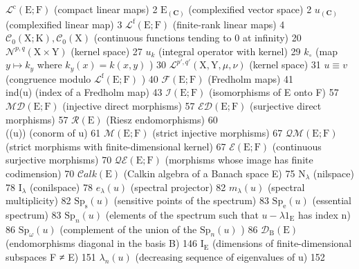 \(\mathcal{L}^{\mathrm{c}}(\mathrm{E};\mathrm{F})\) (compact linear maps) 2 \(\mathrm{E}_{(\mathbf{C})}\) (complexified vector space) 2 \(u_{(\mathbf{C})}\) (complexified linear map) 3 \(\mathcal{L}^{\mathrm{f}}(\mathrm{E};\mathrm{F})\) (finite-rank linear maps) 4 \(\mathcal{C}_0(\mathrm{X};\mathrm{K}), \mathcal{C}_0(\mathrm{X})\) (continuous functions tending to 0 at infinity) 20 \(\mathcal{N}^{p,q}(\mathrm{X} \times \mathrm{Y})\) (kernel space) 27 \(u_k\) (integral operator with kernel) 29 \(k_\circ\) (map \(y \mapsto k_y\) where \(k_y(x) = k(x,y)\) ) 30 \(\mathcal{L}^{p',q'}(\mathrm{X},\mathrm{Y},\mu,\nu)\) (kernel space) 31 \(u \equiv v\) (congruence modulo \(\mathcal{L}^{\mathrm{f}}(\mathrm{E};\mathrm{F})\) ) 40 \(\mathcal{F}(\mathrm{E};\mathrm{F})\) (Fredholm maps) 41\\
ind(u) (index of a Fredholm map) 43 \(\mathcal{I}(\mathrm{E};\mathrm{F})\) (isomorphisms of E onto F) 57 \(\mathcal{M}\mathcal{D}(\mathrm{E};\mathrm{F})\) (injective direct morphisms) 57 \(\mathcal{E}\mathcal{D}(\mathrm{E};\mathrm{F})\) (surjective direct morphisms) 57 \(\mathcal{R}(\mathrm{E})\) (Riesz endomorphisms) 60\\
((u)) (conorm of u) 61 \(\mathcal{M}(\mathrm{E};\mathrm{F})\) (strict injective morphisms) 67 \(\mathcal{Q}\mathcal{M}(\mathrm{E};\mathrm{F})\) (strict morphisms with finite-dimensional kernel) 67 \(\mathcal{E}(\mathrm{E};\mathrm{F})\) (continuous surjective morphisms) 70 \(\mathcal{Q}\mathcal{E}(\mathrm{E};\mathrm{F})\) (morphisms whose image has finite codimension) 70 \(\mathcal{C}alk(\mathrm{E})\) (Calkin algebra of a Banach space E) 75 \(\mathrm{N}_{\lambda}\) (nilspace) 78 \(\mathrm{I}_{\lambda}\) (conilspace) 78 \(e_{\lambda}(u)\) (spectral projector) 82 \(m_{\lambda}(u)\) (spectral multiplicity) 82 \(\mathrm{Sp}_{\mathrm{s}}(u)\) (sensitive points of the spectrum) 83 \(\mathrm{Sp}_{\mathrm{e}}(u)\) (essential spectrum) 83 \(\mathrm{Sp}_{n}(u)\) (elements of the spectrum such that \(u - \lambda 1_{\mathrm{E}}\) has index n) 86 \(\mathrm{Sp}_{\omega}(u)\) (complement of the union of the \(\mathrm{Sp}_{n}(u)\) ) 86 \(\mathcal{D}_{\mathrm{B}}(\mathrm{E})\) (endomorphisms diagonal in the basis B) 146 \(\mathrm{I}_{\mathrm{E}}\) (dimensions of finite-dimensional subspaces F ≠ E) 151 \(\lambda_n(u)\) (decreasing sequence of eigenvalues of u) 152

